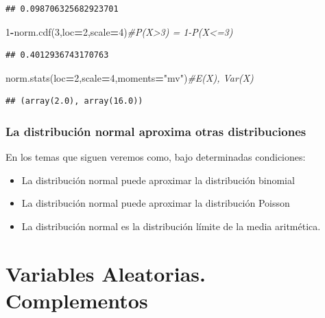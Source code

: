 \documentclass[]{book}
\newenvironment{Shaded}{\begin{snugshade}}{\end{snugshade}}
\newcommand{\CommentTok}[1]{\textcolor[rgb]{0.56,0.35,0.01}{\textit{#1}}}
\newcommand{\DecValTok}[1]{\textcolor[rgb]{0.00,0.00,0.81}{#1}}
\newcommand{\NormalTok}[1]{#1}
\newcommand{\OperatorTok}[1]{\textcolor[rgb]{0.81,0.36,0.00}{\textbf{#1}}}
\newcommand{\StringTok}[1]{\textcolor[rgb]{0.31,0.60,0.02}{#1}}
\providecommand{\tightlist}{%
  \setlength{\itemsep}{0pt}\setlength{\parskip}{0pt}}
\begin{document}
\begin{verbatim}
## 0.098706325682923701
\end{verbatim}

\begin{Shaded}
\begin{Highlighting}[]
\DecValTok{1}\OperatorTok{-}\NormalTok{norm.cdf(}\DecValTok{3}\NormalTok{,loc}\OperatorTok{=}\DecValTok{2}\NormalTok{,scale}\OperatorTok{=}\DecValTok{4}\NormalTok{)}\CommentTok{#P(X>3) = 1-P(X<=3)}
\end{Highlighting}
\end{Shaded}

\begin{verbatim}
## 0.4012936743170763
\end{verbatim}

\begin{Shaded}
\begin{Highlighting}[]
\NormalTok{norm.stats(loc}\OperatorTok{=}\DecValTok{2}\NormalTok{,scale}\OperatorTok{=}\DecValTok{4}\NormalTok{,moments}\OperatorTok{=}\StringTok{"mv"}\NormalTok{)}\CommentTok{#E(X), Var(X)}
\end{Highlighting}
\end{Shaded}

\begin{verbatim}
## (array(2.0), array(16.0))
\end{verbatim}

\hypertarget{la-distribuciuxf3n-normal-aproxima-otras-distribuciones}{%
\subsection{La distribución normal aproxima otras distribuciones}\label{la-distribuciuxf3n-normal-aproxima-otras-distribuciones}}

En los temas que siguen veremos como, bajo determinadas condiciones:

\begin{itemize}
\tightlist
\item
  La distribución normal puede aproximar la distribución binomial
\item
  La distribución normal puede aproximar la distribución Poisson
\item
  La distribución normal es la distribución límite de la media aritmética.
\end{itemize}

\hypertarget{variables-aleatorias.-complementos}{%
\chapter{Variables Aleatorias. Complementos}\label{variables-aleatorias.-complementos}}
\end{document}
